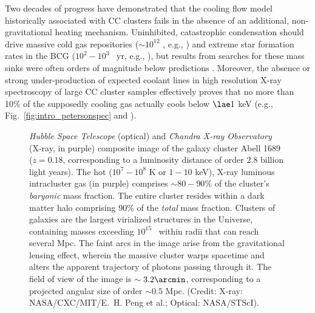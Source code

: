 Two decades of progress have  demonstrated that the cooling flow model
historically associated  with CC clusters  fails in the absence  of an
additional,   non-gravitational    heating   mechanism.   Uninhibited,
catastrophic condensation  should drive massive  cold gas repositories
($\sim10^{12}$  \Msol,  e.g.,  \citealt{fabian94,odea97}) and  extreme
star  formation rates in  the BCG  ($10^2-10^3$ \Msol\  yr\mone, e.g.,
\citealt{peres98}),  but results  from searches  for these  mass sinks
were     often    orders     of     magnitude    below     predictions
\citep[e.g.,][]{allen69,deyoung74,peterson78,haynes78,baan78,shostak80,chrisstefi87,mcnamara89,odea94,odea97,odea98,allen95,mittaz01,edge03}.
Moreover, the  absence or  strong under-production of  expected coolant
lines in  high resolution  X-ray spectroscopy of  large CC
cluster samples effectively proves  that no more than 10\%  
of the supposedly cooling   gas  
actually cools below $\lae  1$   keV  (e.g., Fig.~\ref{fig:intro_petersonspec} and
\citealt{tamura01,peterson01,peterson03,xu02,sakelliou02,sanders08}).





\begin{figure}
\caption[Optical and X-ray composite of the galaxy cluster Abell 1689]{{\it Hubble Space Telescope} (optical) and {\it Chandra X-ray Observatory} (X-ray, in purple) composite image of the galaxy cluster Abell 1689 ($z=0.18$, corresponding to a luminosity distance of order 2.8 billion light years). The hot ($10^{7}-10^{8}$ K or $1-10$ keV), X-ray luminous intracluster gas (in purple) comprises $\sim 80-90 \%$ of the cluster's {\it baryonic} mass fraction. The entire cluster resides within a dark matter halo comprising 90\% of the {\it total} mass fraction. Clusters of galaxies are the largest 
virialized structures in the Universe, containing masses exceeding $10^{15}$ \Msol\ within radii that can reach several Mpc. The faint arcs in the image arise from the gravitational lensing effect, wherein the massive cluster warps spacetime and alters the apparent trajectory of photons passing through it. The field of view of the image is $\sim 3.2\arcmin$, corresponding to a projected angular size of order $\sim 0.5$ Mpc. (Credit: X-ray: NASA/CXC/MIT/E.~H. Peng et al.; Optical: NASA/STScI). }
\label{fig:intro_a1689}
\end{figure}


